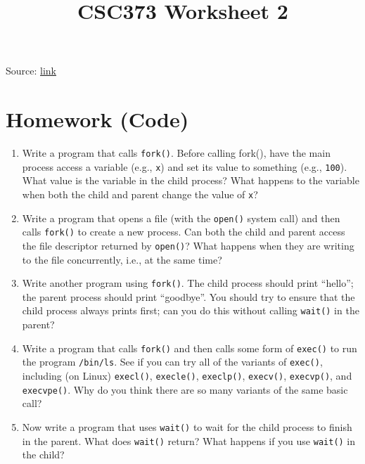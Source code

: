 \documentclass[12pt]{article}
\begin{document}
\title{CSC373 Worksheet 2}
\maketitle

\bigskip

Source: \href{http://pages.cs.wisc.edu/~remzi/OSTEP/cpu-api.pdf}{link}

\bigskip

\section{Homework (Code)}

\begin{enumerate}[1.]
    \item Write a program that calls \texttt{fork()}. Before calling fork(), have the
    main process access a variable (e.g., \texttt{x}) and set its value to something (e.g., \texttt{100}).
    What value is the variable in the child process?
    What happens to the variable when both the child and parent change
    the value of \texttt{x}?

    \item Write a program that opens a file (with the \texttt{open()} system call)
    and then calls \texttt{fork()} to create a new process. Can both the child
    and parent access the file descriptor returned by \texttt{open()}? What
    happens when they are writing to the file concurrently, i.e., at the
    same time?

    \item Write another program using \texttt{fork()}. The child process should
    print “hello”; the parent process should print “goodbye”. You should
    try to ensure that the child process always prints first; can you do
    this without calling \texttt{wait()} in the parent?

    \item Write a program that calls \texttt{fork()} and then calls some form of
    \texttt{exec()} to run the program \texttt{/bin/ls}. See if you can try all of the
    variants of \texttt{exec()}, including (on Linux) \texttt{execl()}, \texttt{execle()},
    \texttt{execlp()}, \texttt{execv()}, \texttt{execvp()}, and \texttt{execvpe()}. Why do
    you think there are so many variants of the same basic call?

    \item Now write a program that uses \texttt{wait()} to wait for the child process
    to finish in the parent. What does \texttt{wait()} return? What happens if
    you use \texttt{wait()} in the child?


\end{enumerate}
\end{document}

